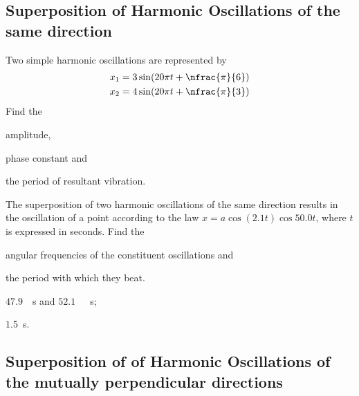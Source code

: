 \subsection{Superposition of Harmonic Oscillations of the same direction}

\begin{problem}
	Two simple harmonic oscillations are represented by 
	\begin{align*}
		x_1 &= 3\sin(20\pi t + \nfrac{\pi}{6}) \\
		x_2 &= 4\sin(20\pi t + \nfrac{\pi}{3})
	\end{align*}
	Find the 
	\begin{enumerate*}[label=(\alph*)]
		\item amplitude,
		\item phase constant and
		\item the period of resultant vibration.
	\end{enumerate*} 
\end{problem}


\begin{problem}
	The superposition of two harmonic oscillations of the same 
	direction results in the oscillation of a point according to the law 
	$x  = a\cos(2.1 t) \cos 50.0 t$, where $t$ is expressed in seconds. Find the
	\begin{enumerate*}[label=(\alph*)]
		\item angular frequencies of the constituent oscillations and
		\item the period with which they beat. 
	\end{enumerate*} 
	\begin{solution}
		\begin{enumerate*}[label=(\alph*)]
			\item $47.9$~\si{\per\second} and $52.1$~~\si{\per\second};
			\item $1.5$~\si{\second}.
		\end{enumerate*}
	\end{solution}
\end{problem}

\subsection{Superposition of of Harmonic Oscillations of the mutually perpendicular directions}


